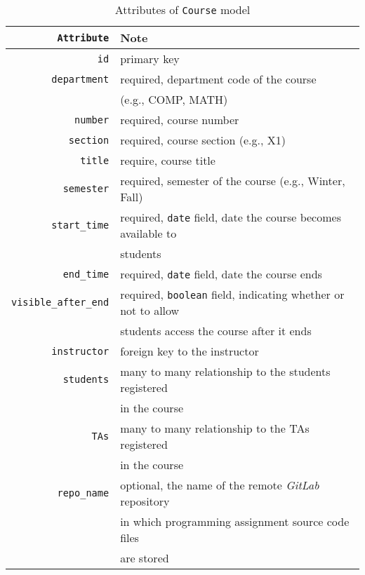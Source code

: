 \begin{table}[ht]
    \centering
    \caption{Attributes of \texttt{Course} model}
    \renewcommand{\arraystretch}{1.5}
    \begin{tabular}[ht]{r|l}
        \hline
        \texttt{Attribute} & Note \\
        \hline
        \hline
        \texttt{id} & primary key \\
        \hline
        \texttt{department} & required, department code of the course \\ & (e.g., COMP, MATH) \\
        \hline
        \texttt{number} & required, course number \\
        \hline
        \texttt{section} & required, course section (e.g., X1) \\
        \hline
        \texttt{title} & require, course title \\
        \hline
        \texttt{semester} & required, semester of the course (e.g., Winter, Fall) \\
        \hline
        \texttt{start\_time} & required, \texttt{date} field, date the course
            becomes available to \\ & students \\
        \hline
        \texttt{end\_time} & required, \texttt{date} field, date the course ends \\
        \hline
        \texttt{visible\_after\_end} & required, \texttt{boolean} field, indicating
            whether or not to allow\\ & students access the course after it ends \\

        \hline
        \hline

        \texttt{instructor} & foreign key to the instructor \\
        \hline
        \texttt{students} & many to many relationship to the students registered \\ & in the course\\
        \hline
        \texttt{TAs} & many to many relationship to the TAs registered \\ & in the course \\

        \hline
        \hline

        \texttt{repo\_name} & optional, the name of the remote \emph{GitLab}
            repository \\ & in 
            which programming assignment source code files \\ & are stored \\
        \hline
        \hline


\end{tabular}
\end{table}
